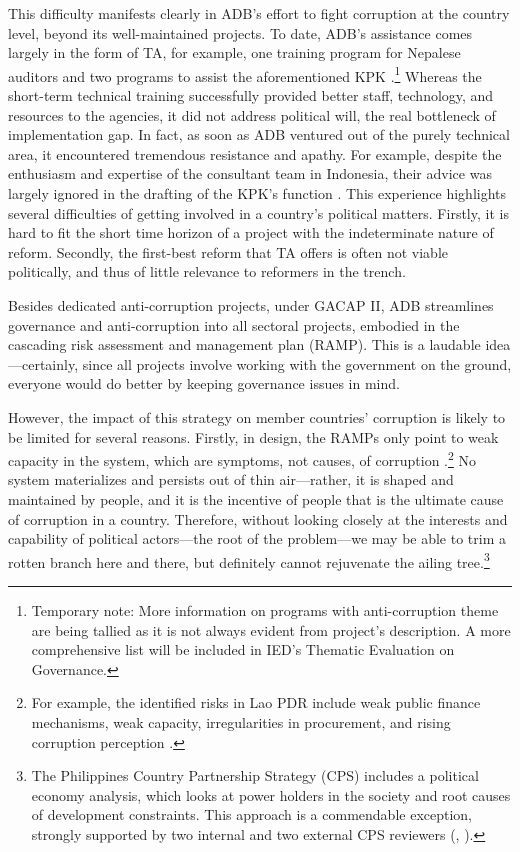 \documentclass[12pt]{article}
\begin{document}
This difficulty manifests clearly in ADB's effort to fight corruption at the country level, beyond its well-maintained projects. To date, ADB's assistance comes largely in the form of TA, for example, one training program for Nepalese auditors and two programs to assist the aforementioned KPK \citep{ADB2003, ADB2005, ADB2011}.\footnote{Temporary note: More information on programs with anti-corruption theme are being tallied as it is not always evident from project's description. A more comprehensive list will be included in IED's Thematic Evaluation on Governance.}  Whereas the short-term technical training successfully provided better staff, technology, and resources to the agencies, it did not address political will, the real bottleneck of implementation gap. In fact, as soon as ADB ventured out of the purely technical area, it encountered tremendous resistance and apathy. For example, despite the enthusiasm and expertise of the consultant team in Indonesia, their advice was largely ignored in the drafting of the KPK's function \citep{ADB2003, Schutte2012}. This experience highlights several difficulties of getting involved in a country's political matters. Firstly, it is hard to fit the short time horizon of a project with the indeterminate nature of reform. Secondly, the first-best reform that TA offers is often not viable politically, and thus of little relevance to reformers in the trench.

Besides dedicated anti-corruption projects, under GACAP II, ADB streamlines governance and anti-corruption into all sectoral projects, embodied in the cascading risk assessment and management plan (RAMP). This is a laudable idea---certainly, since all projects involve working with the government on the ground, everyone would do better by keeping governance issues in mind.

However, the impact of this strategy on member countries' corruption is likely to be limited for several reasons. Firstly, in design, the RAMPs only point to weak capacity in the system, which are symptoms, not causes, of corruption \citep[6]{ADB2013}.\footnote{For example, the identified risks in Lao PDR include weak public finance mechanisms, weak capacity, irregularities in procurement, and rising corruption perception \citep{ADB2011a}.} No system materializes and persists out of thin air---rather, it is shaped and maintained by people, and it is the incentive of people that is the ultimate cause of corruption in a country. Therefore, without looking closely at the interests and capability of political actors---the root of the problem---we may be able to trim a rotten branch here and there, but definitely cannot rejuvenate the ailing tree.\footnote{The Philippines Country Partnership Strategy (CPS) includes a political economy analysis, which looks at power holders in the society and root causes of development constraints. This approach is a commendable exception, strongly supported by two internal and two external CPS reviewers (\citealp{ADB2010}, \citealp{ADB2011b}).}
\end{document}
